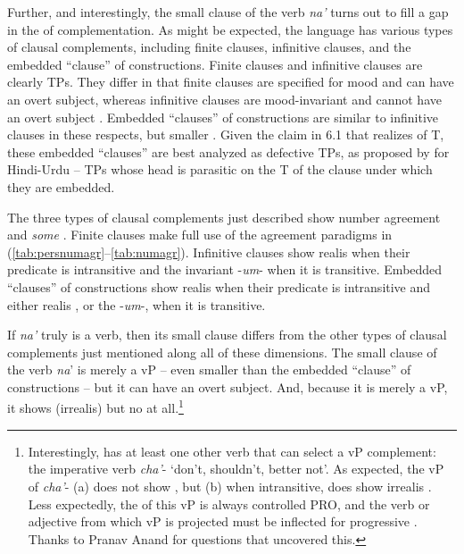 \documentclass[output=paper,
modfonts
]{LSP/langsci}
\begin{document}
\begin{exe}
\begin{xlist}
Further, and interestingly, the small clause  of the verb
\emph{na'} turns out to fill a gap in the  of 
complementation. As might be expected, the language has various types of
clausal complements, including finite clauses, infinitive clauses, and
the embedded ``clause'' of  constructions. Finite clauses and
infinitive clauses are clearly TPs. They differ in that finite clauses
are specified for mood and can have an overt subject, whereas infinitive
clauses are mood-invariant and cannot have an overt subject \citep[see][64--68]{chung1998}. Embedded ``clauses'' of  constructions are
similar to infinitive clauses in these respects, but smaller \citep[see][]{chung2004}. Given the claim in 6.1 that  realizes
 of T, these embedded ``clauses'' are best analyzed as defective
TPs, as proposed by \citealt{bhatt2005} for Hindi-Urdu -- TPs whose head is
parasitic on the T of the clause under which they are embedded.

The three types of clausal complements just described show number
agreement and \emph{some} . Finite clauses
make full use of the agreement paradigms in (\ref{tab:persnumagr}--\ref{tab:numagr}). Infinitive clauses
show realis  when their predicate is intransitive and
the invariant  -\emph{um}- when it is transitive. Embedded
``clauses'' of  constructions show realis  when their
predicate is intransitive and either realis ,
or the  -\emph{um}-, when it is transitive.

If \emph{na'} truly is a verb, then its small clause  differs
from the other types of clausal complements just mentioned along all of
these dimensions. The small clause  of the verb \emph{na}' is
merely a vP -- even smaller than the embedded ``clause'' of
 constructions -- but it can have an overt subject. And, because it is
merely a vP, it shows (irrealis)  but no
 at all.\footnote{Interestingly,  has
  at least one other verb that can select a vP complement: the
  imperative verb \emph{cha'}- `don't, shouldn't, better not'. As
  expected, the vP  of \emph{cha'}- (a) does not show
  , but (b) when intransitive, does show
  irrealis . Less expectedly, the  of this vP
  is always controlled PRO, and the verb or adjective from which vP is
  projected must be inflected for progressive . Thanks to Pranav
  Anand for questions that uncovered this.}


\end{xlist}
\end{exe}
\end{document}
